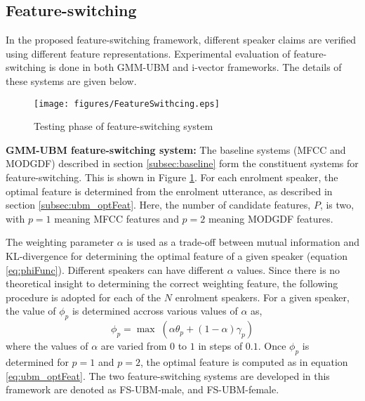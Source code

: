 \documentclass{article}
\begin{document}
	
\subsection{Feature-switching}
\label{subsec:featSwitch}

In the proposed feature-switching framework, different speaker
claims are verified using different feature representations. 
Experimental evaluation of feature-switching is done in both
GMM-UBM and i-vector frameworks. The details of these systems
are given below.

\begin{figure}[h]
\texttt{[image: figures/FeatureSwithcing.eps]}
\caption{Testing phase of feature-switching system}
\label{fig:systemArch2}
\end{figure}


\textbf{GMM-UBM feature-switching system:}
The baseline systems (MFCC and MODGDF) described in section \ref{subsec:baseline} 
form the constituent systems for feature-switching. This is shown in Figure
\ref{fig:systemArch2}. For each enrolment speaker, the optimal feature is 
determined from the enrolment utterance, as described in section \ref{subsec:ubm_optFeat}. Here, the number of candidate features, $P$, is two, with $p=1$ meaning 
MFCC features and $p=2$ meaning MODGDF features.

The weighting parameter $\alpha$ is used as a trade-off between mutual information and
KL-divergence for determining the optimal feature of a given speaker (equation
\ref{eq:phiFunc}). Different speakers can have different $\alpha$ values. Since
there is no theoretical insight to determining the correct weighting feature,
the following procedure is adopted for each of the $N$ enrolment speakers.
For a given speaker, the value of $\phi_p$ is determined accross various values
of $\alpha$ as, 
\begin{equation}
\phi_p = \max \; (\alpha \theta_p + (1-\alpha) \gamma_p)
\end{equation}
where the values of $\alpha$ are varied from $0$ to $1$ in steps of $0.1$. Once
$\phi_p$ is determined for $p=1$ and $p=2$, the optimal feature is computed as in equation
\ref{eq:ubm_optFeat}.
The two feature-switching systems are developed in this framework are denoted as
FS-UBM-male, and FS-UBM-female. 
\end{document}
